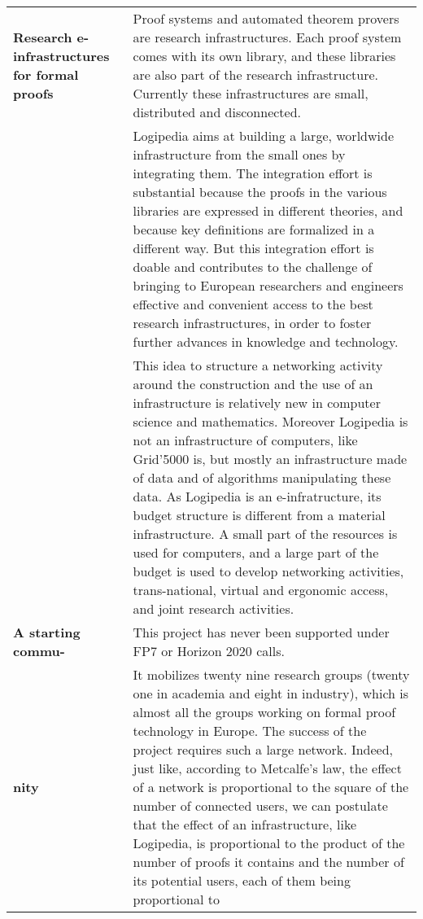 \begin{longtable}{|p{}|p{}|}
\hline
{\bf Research \newline e-infrastructures for formal proofs}
&
Proof systems and automated theorem provers are research
infrastructures. Each proof system comes with its own library, and
these libraries are also part of the research infrastructure.  Currently
these infrastructures are small, distributed and disconnected.\\
&
\hspace{0.4cm}
Logipedia aims at building a large, worldwide infrastructure from the
small ones by integrating them.  The integration effort is substantial
because the proofs in the various libraries are expressed in different
theories, and because key definitions are formalized in a different
way.  But this integration effort is doable and contributes to the
challenge of bringing to European researchers and engineers effective and
convenient access to the best research infrastructures, in order to
foster further advances in knowledge and technology.\\
&
\hspace{0.4cm}
This idea to structure a networking activity around the construction
and the use of an infrastructure is relatively new in computer science
and mathematics. Moreover Logipedia is not an infrastructure of
computers, like Grid'5000 is, but mostly an infrastructure made of
data and of algorithms manipulating these data.  As Logipedia is an
e-infratructure, its budget structure is different from a material
infrastructure. A small part of the resources is used for computers,
and a large part of the budget is used to develop networking
activities, trans-national, virtual and ergonomic access, and joint
research activities.\\
\hline
{\bf A starting commu-}
&
This project has never been supported under FP7 or Horizon 2020 calls.\\
{\bf nity} &
\hspace{0.4cm} It mobilizes twenty nine research groups (twenty one in
academia and eight in industry), which is
almost all the groups working on formal proof technology in Europe.
The success of the project requires such a large network.  Indeed,
just like, according to Metcalfe's law, the effect of a network is
proportional to the square of the number of connected users, we can
postulate that the effect of an infrastructure, like Logipedia, is
proportional to the product of the number of proofs it contains and
the number of its potential users, each of them being proportional to

\end{longtable}
